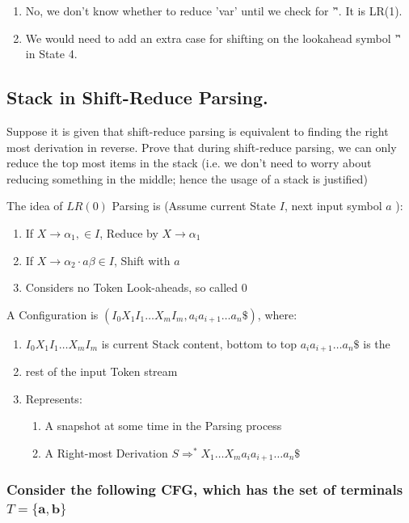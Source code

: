 \documentclass[a4paper]{exam}
\begin{document}
\begin{solution}
\begin{enumerate}
    \item No, we don't know whether to reduce 'var' until we check for '\^'. It is LR(1).
    \item We would need to add an extra case for shifting on the lookahead symbol '\^' in State 4.
\end{enumerate}
\end{solution}


\subsection{Stack in Shift-Reduce Parsing.}
Suppose  it  is  given  that  shift-reduce  parsing  is  equivalent  to  finding  the  right most derivation in reverse.  Prove that during shift-reduce parsing, we can only reduce the top most items in the stack (i.e.  we don’t need to worry about reducing something in the middle; hence the usage of a stack is justified)

The idea of $L R(0)$ Parsing is (Assume current State $I$, next input symbol $a$ ):
\begin{enumerate}
    \item If $X \rightarrow \alpha_{1}, \in I$, Reduce by $X \rightarrow \alpha_{1}$
    \item If $X \rightarrow \alpha_{2} \cdot a \beta \in I$, Shift with $a$
    \item Considers no Token Look-aheads, so called 0
\end{enumerate}
A Configuration is $\left(I_{0} X_{1} I_{1} \ldots X_{m} I_{m}, a_{i} a_{i+1} \ldots a_{n} \$\right)$, where:
\begin{enumerate}
    \item $I_{0} X_{1} I_{1} \ldots X_{m} I_{m}$ is current Stack content, bottom to top $a_{i} a_{i+1} \ldots a_{n} \$$ is the \item rest of the input Token stream
    \item Represents:
    \begin{enumerate}
        \item A snapshot at some time in the Parsing process
\item A Right-most Derivation $S \Rightarrow^{*} X_{1} \ldots X_{m} a_{i} a_{i+1} \ldots a_{n} \$$
    \end{enumerate}
\end{enumerate}
\subsubsection{Consider the following CFG, which has the set of terminals $T=\{\mathbf{a}, \mathbf{b}\}$}
\end{document}
